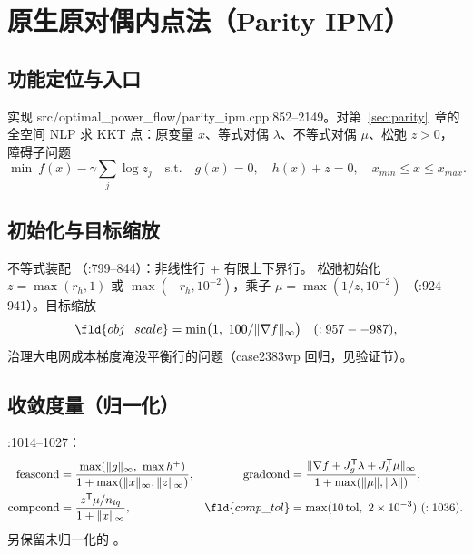 \section{原生原对偶内点法（Parity IPM）}\label{sec:ipm}

\subsection{功能定位与入口}
实现 src/optimal\_power\_flow/parity\_ipm.cpp:852--2149。对第~\ref{sec:parity}~章的
全空间 NLP 求 KKT 点：原变量 $x$、等式对偶 $\lambda$、不等式对偶 $\mu$、松弛 $z>0$，
障碍子问题
\[
\min\ f(x)-\gamma\sum_j\log z_j\quad\mathrm{s.t.}\quad g(x)=0,\quad h(x)+z=0,\quad x_{min}\le x\le x_{max}.
\]

\subsection{初始化与目标缩放}
不等式装配 （:799--844）：非线性行 + 有限上下界行。
松弛初始化 $z=\max(r_h,1)$ 或 $\max(-r_h,10^{-2})$，乘子 $\mu=\max(1/z,10^{-2})$
（:924--941）。目标缩放
\[
\fld{obj\_scale}=\min\bigl(1,\ 100/\lVert\nabla f\rVert_\infty\bigr)\quad(:957--987),
\]
治理大电网成本梯度淹没平衡行的问题（case2383wp 回归，见验证节）。

\subsection{收敛度量（归一化）}
:1014--1027：
\begin{align*}
\mathrm{feascond}&=\frac{\max(\lVert g\rVert_\infty,\ \max h^+)}{1+\max(\lVert x\rVert_\infty,\lVert z\rVert_\infty)},
&\mathrm{gradcond}&=\frac{\lVert\nabla f+J_g^{\mathsf T}\lambda+J_h^{\mathsf T}\mu\rVert_\infty}{1+\max(\lVert\mu\rVert,\lVert\lambda\rVert)},\\
\mathrm{compcond}&=\frac{z^{\mathsf T}\mu/n_{iq}}{1+\lVert x\rVert_\infty},
&\fld{comp\_tol}&=\max(10\,\mathrm{tol},\ 2\times10^{-3})\ (:1036).
\end{align*}
另保留未归一化的 。

